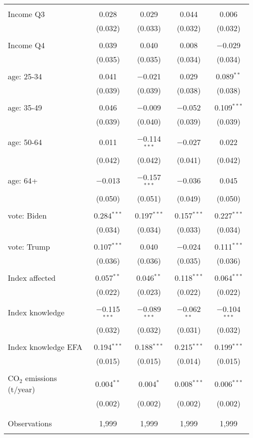 \begin{tabular}{@{\extracolsep{5pt}}lcccc}
  & & & & \\ 
 Income Q3 & 0.028 & 0.029 & 0.044 & 0.006 \\ 
  & (0.032) & (0.033) & (0.032) & (0.032) \\ 
  & & & & \\ 
 Income Q4 & 0.039 & 0.040 & 0.008 & $-$0.029 \\ 
  & (0.035) & (0.035) & (0.034) & (0.034) \\ 
  & & & & \\ 
 age: 25-34 & 0.041 & $-$0.021 & 0.029 & 0.089$^{**}$ \\ 
  & (0.039) & (0.039) & (0.038) & (0.038) \\ 
  & & & & \\ 
 age: 35-49 & 0.046 & $-$0.009 & $-$0.052 & 0.109$^{***}$ \\ 
  & (0.039) & (0.040) & (0.039) & (0.039) \\ 
  & & & & \\ 
 age: 50-64 & 0.011 & $-$0.114$^{***}$ & $-$0.027 & 0.022 \\ 
  & (0.042) & (0.042) & (0.041) & (0.042) \\ 
  & & & & \\ 
 age: 64+ & $-$0.013 & $-$0.157$^{***}$ & $-$0.036 & 0.045 \\ 
  & (0.050) & (0.051) & (0.049) & (0.050) \\ 
  & & & & \\ 
 vote: Biden & 0.284$^{***}$ & 0.197$^{***}$ & 0.157$^{***}$ & 0.227$^{***}$ \\ 
  & (0.034) & (0.034) & (0.033) & (0.034) \\ 
  & & & & \\ 
 vote: Trump & 0.107$^{***}$ & 0.040 & $-$0.024 & 0.111$^{***}$ \\ 
  & (0.036) & (0.036) & (0.035) & (0.036) \\ 
  & & & & \\ 
 Index affected & 0.057$^{**}$ & 0.046$^{**}$ & 0.118$^{***}$ & 0.064$^{***}$ \\ 
  & (0.022) & (0.023) & (0.022) & (0.022) \\ 
  & & & & \\ 
 Index knowledge & $-$0.115$^{***}$ & $-$0.089$^{***}$ & $-$0.062$^{**}$ & $-$0.104$^{***}$ \\ 
  & (0.032) & (0.032) & (0.031) & (0.032) \\ 
  & & & & \\ 
 Index knowledge EFA & 0.194$^{***}$ & 0.188$^{***}$ & 0.215$^{***}$ & 0.199$^{***}$ \\ 
  & (0.015) & (0.015) & (0.014) & (0.015) \\ 
  & & & & \\ 
 CO$_{2}$ emissions (t/year) & 0.004$^{**}$ & 0.004$^{*}$ & 0.008$^{***}$ & 0.006$^{***}$ \\ 
  & (0.002) & (0.002) & (0.002) & (0.002) \\ 
  & & & & \\ 
\hline \\[-1.8ex] 

Observations & 1,999 & 1,999 & 1,999 & 1,999 \\ 
\hline 
\hline \\[-1.8ex] 
\end{tabular} 